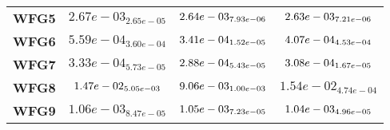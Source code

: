 \documentclass{article}
\begin{document}
\begin{table}[!htp]
\begin{scriptsize}
\begin{tabular}{c|ccc}
      \textbf{WFG5} & $2.67e-03_{2.65e-05} $ & $ \cellcolor{gray25} 2.64e-03_{7.93e-06} $ & $ \cellcolor{gray95} 2.63e-03_{7.21e-06}$ \\
      \textbf{WFG6} & $5.59e-04_{3.60e-04} $ & $ \cellcolor{gray95} 3.41e-04_{1.52e-05} $ & $ \cellcolor{gray25} 4.07e-04_{4.53e-04}$ \\
      \textbf{WFG7} & $3.33e-04_{5.73e-05} $ & $ \cellcolor{gray95} 2.88e-04_{5.43e-05} $ & $ \cellcolor{gray25} 3.08e-04_{1.67e-05}$ \\
      \textbf{WFG8} & $\cellcolor{gray25} 1.47e-02_{5.05e-03} $ & $ \cellcolor{gray95} 9.06e-03_{1.00e-03} $ & $ 1.54e-02_{4.74e-04}$ \\
      \textbf{WFG9} & $1.06e-03_{8.47e-05} $ & $ \cellcolor{gray25} 1.05e-03_{7.23e-05} $ & $ \cellcolor{gray95} 1.04e-03_{4.96e-05}$ \\
  \end{tabular}
  \end{scriptsize}
\end{table}
\end{document}
